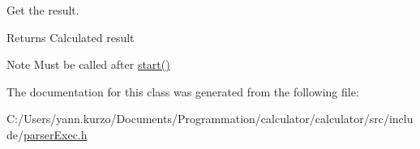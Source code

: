 Get the result. 

\begin{DoxyReturn}{Returns}
Calculated result 
\end{DoxyReturn}
\begin{DoxyNote}{Note}
Must be called after \hyperlink{class_parser_exec_aa00f3c5f1f4ea46e1c6aafebff8d4e9f}{start()} 
\end{DoxyNote}


The documentation for this class was generated from the following file\+:\begin{DoxyCompactItemize}
\item 
C\+:/\+Users/yann.\+kurzo/\+Documents/\+Programmation/calculator/calculator/src/include/\hyperlink{parser_exec_8h}{parser\+Exec.\+h}\end{DoxyCompactItemize}
